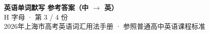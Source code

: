 \documentclass[10pt,a4paper]{article}
\begin{document}
\pagestyle{plain}

\begin{center}
{\LARGE\bfseries 英语单词默写 \quad 参考答案（中 $\to$ 英）}\\[0.22em]
{\large H 字母 · 第 3 / 4 份}\\[0.18em]
{\small 2026年上海市高考英语词汇用法手册 · 参照普通高中英语课程标准}
\end{center}

\vspace{0.2em}
\noindent{\color{rulegray}\rule{\textwidth}{0.8pt}}

\vspace{0.35em}

\vspace{0.25em}
\renewcommand{\arraystretch}{1.32}
\end{document}
